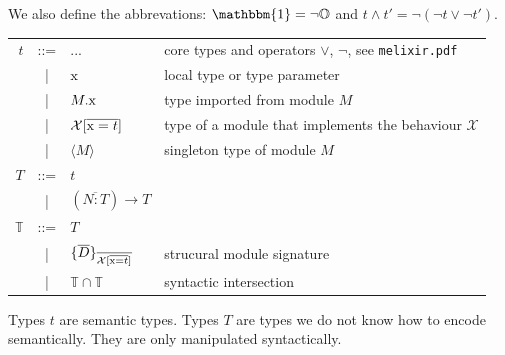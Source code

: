 \documentclass[12pt]{article}
\newcommand{\tx}{\text{\rm x}}
\newcommand{\BX}{\ensuremath{\mathcal{X}}}
\newcommand{\toptype}{\mathbbm{1}}
\begin{document}
We also define the abbrevations: $\toptype = \lnot \mathbb{O}$ and $t \wedge t' = \lnot(\lnot t \vee \lnot t')$.

\begin{center}
    \begin{tabular}{rcll}
        $t$          & ::= & $ ... $                                                   & \color{Gray}  core types and operators $\vee$, $\lnot$, see \texttt{melixir.pdf} \\
                     & |   & $\tx$                                                     & \color{Gray} local type or type parameter                                        \\
                     & |   & $M.\tx$                                                   & \color{Gray} type imported from module $M$                                       \\
                     & |   & $\BX[\overline{\tx = t}]$                                 & \color{Gray} type of a module that implements the behaviour $\BX$                \\
                     & |   & $\langle M \rangle$                                       & \color{Gray} singleton type of module $M$                                        \\[3mm]
        $T$          & ::= & $t$                                                                                                                                          \\
                     & |   & $(\overline{N : T}) \rightarrow T$                                                                                                           \\[3mm]
        $\mathbb{T}$ & ::= & $T$                                                                                                                                          \\
                     & |   & $\{ \overline{D} \}_{\overline{\BX[\overline{\tx = t}]}}$ & \color{gray} strucural module signature                                          \\
                     & |   & $\mathbb{T} \cap \mathbb{T}$                              & \color{gray} syntactic intersection
    \end{tabular}
\end{center}

Types $t$ are semantic types.
Types $T$ are types we do not know how to encode semantically. They are only manipulated syntactically.
\end{document}
